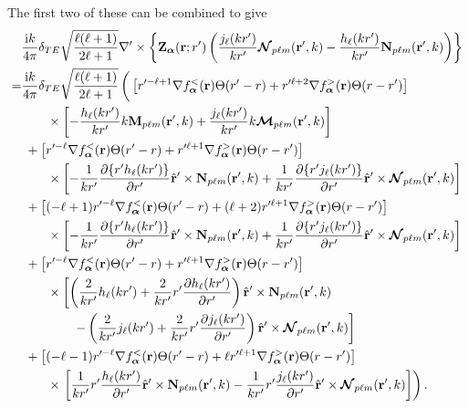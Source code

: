 \documentclass{article}
\begin{document}
The first two of these can be combined to give
\begin{equation}
\begin{split}
&\frac{\mathrm{i}k}{4\pi}\delta_{TE}\sqrt{\frac{\ell(\ell + 1)}{2\ell + 1}}\nabla'\times\left\{\mathbf{Z}_{\bm{\alpha}}(\mathbf{r};r')\left(\frac{j_\ell(kr')}{kr'}\bm{\mathcal{N}}_{p\ell m}(\mathbf{r}',k) - \frac{h_\ell(kr')}{kr'}\mathbf{N}_{p\ell m}(\mathbf{r}',k)\right)\right\}\\
=& \frac{\mathrm{i}k}{4\pi}\delta_{TE}\sqrt{\frac{\ell(\ell + 1)}{2\ell + 1}}\left( \vphantom{\frac{1}{kr'}} \left[r'^{-\ell + 1}\nabla f_{\bm{\alpha}}^<(\mathbf{r})\Theta(r' - r) + r'^{\ell + 2}\nabla f_{\bm{\alpha}}^>(\mathbf{r})\Theta(r - r')\right]\right.\\
&\qquad\times\left[-\frac{h_\ell(kr')}{kr'}k\mathbf{M}_{p\ell m}(\mathbf{r}',k) + \frac{j_\ell(kr')}{kr'}k\bm{\mathcal{M}}_{p\ell m}(\mathbf{r}',k)\right]\\
&\;+ \left[r'^{-\ell}\nabla f_{\bm{\alpha}}^<(\mathbf{r})\Theta(r' - r) + r'^{\ell + 1}\nabla f_{\bm{\alpha}}^>(\mathbf{r})\Theta(r - r')\right]\\
&\qquad\times\left[-\frac{1}{kr'}\frac{\partial\{r'h_\ell(kr')\}}{\partial r'}\hat{\mathbf{r}}'\times\mathbf{N}_{p\ell m}(\mathbf{r}',k) + \frac{1}{kr'}\frac{\partial\{r'j_\ell(kr')\}}{\partial r'}\hat{\mathbf{r}}'\times\bm{\mathcal{N}}_{p\ell m}(\mathbf{r}',k)\right]\\
&\;+ \left[(-\ell + 1)r'^{-\ell}\nabla f_{\bm{\alpha}}^<(\mathbf{r})\Theta(r' - r) + (\ell + 2)r'^{\ell + 1}\nabla f_{\bm{\alpha}}^>(\mathbf{r})\Theta(r - r')\right]\\
&\qquad\times \left[-\frac{1}{kr'}\frac{\partial\{r'h_\ell(kr')\}}{\partial r'}\hat{\mathbf{r}}'\times\mathbf{N}_{p\ell m}(\mathbf{r}',k) + \frac{1}{kr'}\frac{\partial\{r'j_\ell(kr')\}}{\partial r'}\hat{\mathbf{r}}'\times\bm{\mathcal{N}}_{p\ell m}(\mathbf{r}',k)\right]\\
&\;+ \left[r'^{-\ell}\nabla f_{\bm{\alpha}}^<(\mathbf{r})\Theta(r' - r) + r'^{\ell + 1}\nabla f_{\bm{\alpha}}^>(\mathbf{r})\Theta(r - r')\right]\\
&\qquad\times \left[\left(\frac{2}{kr'}h_\ell(kr') + \frac{2}{kr'}r'\frac{\partial h_\ell(kr')}{\partial r'}\right)\hat{\mathbf{r}}'\times\mathbf{N}_{p\ell m}(\mathbf{r}',k)\right.\\
&\qquad\qquad\left.- \left(\frac{2}{kr'}j_\ell(kr') + \frac{2}{kr'}r'\frac{\partial j_\ell(kr')}{\partial r'}\right)\hat{\mathbf{r}}'\times\bm{\mathcal{N}}_{p\ell m}(\mathbf{r}',k)\right]\\
&\;+\left[(-\ell - 1)r'^{-\ell}\nabla f_{\bm{\alpha}}^<(\mathbf{r})\Theta(r' - r) + \ell r'^{\ell + 1}\nabla f_{\bm{\alpha}}^>(\mathbf{r})\Theta(r - r')\right]\\
&\qquad\times\left.\left[\frac{1}{kr'}r'\frac{h_\ell(kr')}{\partial r'}\hat{\mathbf{r}}'\times\mathbf{N}_{p\ell m}(\mathbf{r}',k) - \frac{1}{kr'}r'\frac{j_\ell(kr')}{\partial r'}\hat{\mathbf{r}}'\times\bm{\mathcal{N}}_{p\ell m}(\mathbf{r}',k)\right]\right).
\end{split}
\end{equation}
\end{document}
